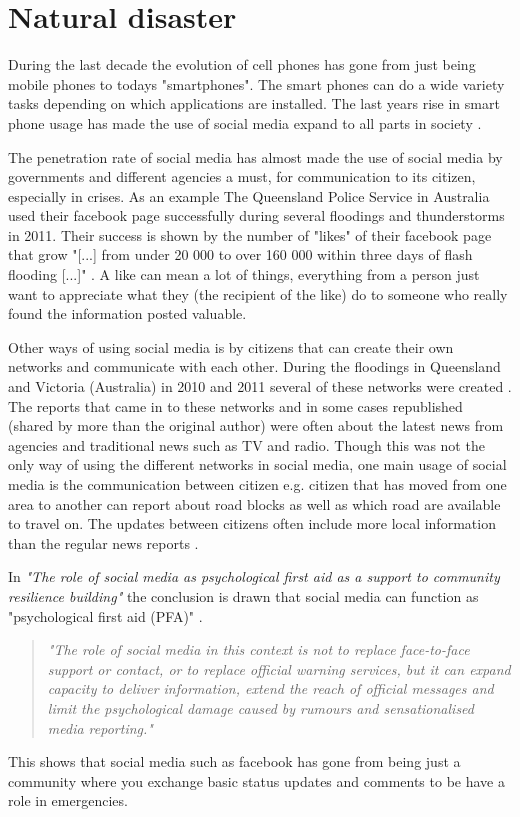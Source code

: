 \section{Natural disaster}
During the last decade the evolution of cell phones has gone from just being mobile phones to todays "smartphones".
The smart phones can do a wide variety tasks depending on which applications are installed.
The last years rise in smart phone usage has made the use of social media expand to all parts in society \cite{taylor2012}.

The penetration rate of social media has almost made the use of social media by governments and different agencies a must, for communication to its citizen, especially in crises.
As an example The Queensland Police Service in Australia used their facebook page successfully during several floodings and thunderstorms in 2011.
Their success is shown by the number of "likes" of their facebook page that grow "[...] from under 20 000 to over 160 000 within three days of flash flooding [...]" \cite{taylor2012}.
A like can mean a lot of things, everything from a person just want to appreciate what they (the recipient of the like) do to someone who really found the information posted valuable.

Other ways of using social media is by citizens that can create their own networks and communicate with each other.
During the floodings in Queensland and Victoria (Australia) in 2010 and 2011 several of these networks were created \cite{bird2012}.
The reports that came in to these networks and in some cases republished (shared by more than the original author) were often about the latest news from agencies and traditional news such as TV and radio.
Though this was not the only way of using the different networks in social media, one main usage of social media is the communication between citizen e.g. citizen that has moved from one area to another can report about road blocks as well as which road are available to travel on.
The updates between citizens often include more local information than the regular news reports \cite{bird2012}.

In \textit{"The role of social media as psychological first aid as a support to community resilience building"} \cite{taylor2012} the conclusion is drawn that social media can function as "psychological first aid (PFA)" \cite{taylor2012}. 
\begin{quote}
\textit{"The role of social media in
this context is not to replace face-to-face support or contact, or to replace official warning services, but it can expand capacity to deliver information, extend the reach of official messages and limit the psychological damage caused by rumours and sensationalised media reporting."} \cite{taylor2012}
\end{quote}
This shows that social media such as facebook has gone from being just a community where you exchange basic status updates and comments to be have a role in emergencies.

